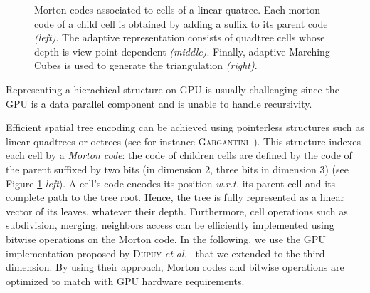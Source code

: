 \documentclass{llncs}
\newcommand{\wrt}{\emph{w.r.t.} }
\begin{document}
\begin{figure}[!htbp]
  \vspace{-0.35cm}
  \begin{center}
  \end{center}
  \vspace{-0.35cm}
\caption{Morton codes associated to cells of a linear quatree. Each
   morton code of a child cell is obtained by adding a suffix to its
  parent code \emph{(left)}. The adaptive representation consists of
  quadtree cells whose depth is view point dependent
  \emph{(middle)}. Finally, adaptive Marching Cubes is used to
  generate the triangulation \emph{(right)}.}
\label{fig_quadtree_partitionning}
\end{figure}

Representing a hierachical structure on GPU is usually challenging since
the GPU is a data parallel component and is unable to handle recursivity.


Efficient spatial tree encoding can be
achieved using pointerless structures such as linear quadtrees or octrees (see
for instance \textsc{Gargantini}~\cite{gargantini1982effective}). This structure
indexes each cell by a \emph{Morton code}: the code of children
cells are defined by the code of the parent suffixed by two bits (in dimension
2, three bits in dimension 3) (see Figure
\ref{fig_quadtree_partitionning}-\emph{left}). A cell's code encodes its
position \wrt its parent cell and its complete path to the tree root.
Hence, the tree is fully represented as a linear vector of its leaves, whatever their depth.
Furthermore, cell operations such as subdivision, merging, neighbors
access can be efficiently implemented using bitwise operations on the Morton
code. In the following, we use the GPU implementation proposed by \textsc{Dupuy}
\textit{et al.}~\cite{dupuy2014quadtrees} that we extended to the third dimension.
By using their approach, Morton codes
and bitwise operations are optimized to match with GPU hardware requirements.
\end{document}
